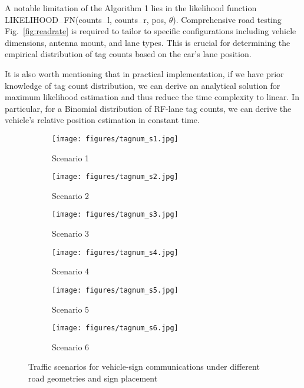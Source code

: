 \documentclass[lettersize,journal]{IEEEtran}
\begin{document}
A notable limitation of the Algorithm 1 lies in the likelihood function LIKELIHOOD$\rule{0.2cm}{0.02mm}$FN(counts$\rule{0.2cm}{0.02mm}$l, counts$\rule{0.2cm}{0.02mm}$r, pos, $\theta$). Comprehensive road testing Fig.~\ref{fig:readrate} is required to tailor to specific configurations including vehicle dimensions, antenna mount, and lane types. This is crucial for determining the empirical distribution of tag counts based on the car's lane position.

It is also worth mentioning that in practical implementation, if we have prior knowledge of tag count distribution, we can derive an analytical solution for maximum likelihood estimation and thus reduce the time complexity to linear. In particular, for a Binomial distribution of RF-lane tag counts, we can derive the vehicle's relative position estimation in constant time.


\begin{figure*}[tb!]
\centering
\begin{subfigure}{0.305\textwidth}
  \centering
  \texttt{[image: figures/tagnum\_s1.jpg]}
  \caption{Scenario 1}
  \label{fig:tagnum_s1}
\end{subfigure}
\begin{subfigure}{0.305\textwidth}
  \centering
  \texttt{[image: figures/tagnum\_s2.jpg]}
  \caption{Scenario 2}
  \label{fig:tagnum_s2}
\end{subfigure}
\begin{subfigure}{0.305\textwidth}
  \centering
  \texttt{[image: figures/tagnum\_s3.jpg]}
  \caption{Scenario 3}
  \label{fig:tagnum_s3}
\end{subfigure}
\begin{subfigure}{0.305\textwidth}
  \centering
  \texttt{[image: figures/tagnum\_s4.jpg]}
  \caption{Scenario 4}
  \label{fig:tagnum_s4}
\end{subfigure}
\begin{subfigure}{0.305\textwidth}
  \centering
  \texttt{[image: figures/tagnum\_s5.jpg]}
  \caption{Scenario 5}
  \label{fig:tagnum_s5}
\end{subfigure}
\begin{subfigure}{0.305\textwidth}
  \centering
  \texttt{[image: figures/tagnum\_s6.jpg]}
  \caption{Scenario 6}
  \label{fig:tagnum_s6}
\end{subfigure}
\caption{Traffic scenarios for vehicle-sign communications under different road geometries and sign placement}
\label{fig:trafficsign_scenario}
\end{figure*}
\end{document}
